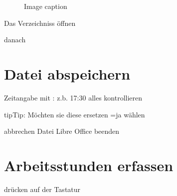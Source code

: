 \documentclass[letterpaper,10pt,english]{sphinxmanual}
\begin{document}
\begin{figure}[htbp]
\centering
\capstart

\noindent{}
\caption{Image caption}\label{\detokenize{intro_01:id1}}\end{figure}

\sphinxAtStartPar
Das Verzeichniss öffnen

\begin{sphinxVerbatim}[commandchars=\\\{\}]
  
\end{sphinxVerbatim}

\sphinxAtStartPar
danach

\begin{sphinxVerbatim}[commandchars=\\\{\}]
\end{sphinxVerbatim}

\sphinxstepscope


\chapter{Datei abspeichern}
\label{\detokenize{intro_02:datei-abspeichern}}\label{\detokenize{intro_02::doc}}
\sphinxAtStartPar
Zeitangabe mit : z.b. 17:30
alles kontrollieren

\begin{sphinxVerbatim}[commandchars=\\\{\}]
  
\end{sphinxVerbatim}

\begin{sphinxadmonition}{tip}{Tip:}
\sphinxAtStartPar
Möchten sie diese ersetzen =ja wählen
\end{sphinxadmonition}

\sphinxAtStartPar
abbrechen
Datei Libre Office beenden

\begin{sphinxVerbatim}[commandchars=\\\{\}]
      
\end{sphinxVerbatim}

\sphinxstepscope


\chapter{Arbeitsstunden erfassen}
\label{\detokenize{intro_03:arbeitsstunden-erfassen}}\label{\detokenize{intro_03::doc}}
\sphinxAtStartPar
{}  drücken
auf der Tastatur
\end{document}
